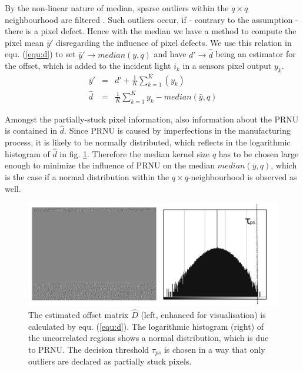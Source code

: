 \documentclass[10pt,twocolumn,letterpaper]{article}
\begin{document}
By the non-linear nature of median, sparse outliers within the $q \times q$ neighbourhood are filtered  \cite{fridrich}. Such outliers occur, if - contrary to the assumption - there is a pixel defect. Hence with the median we have a method to compute the pixel mean $\bar{y}'$ disregarding the influence of pixel defects. We use this relation in equ. (\ref{equ:d}) to set $\bar{y}' \rightarrow median(y,q)$ and have $d' \rightarrow \hat{d}$ being an estimator for the offset, which is added to the incident light $i_k$ in a sensors pixel output $y_k$.
\begin{eqnarray}
\bar{y}' & = & d'+\frac{1}{K}\sum\limits_{k=1}^{K}(y_k) \label{equ:modelWithD} \\
\hat{d} & = & \frac{1}{K}\sum\limits_{k=1}^{K}y_k - median(\bar{y},q) \label{equ:d}
\end{eqnarray}

Amongst the partially-stuck pixel information, also information about the PRNU is contained in $\hat{d}$. Since PRNU is caused by imperfections in the manufacturing process, it is likely to be normally distributed, which reflects in the logarithmic histogram of $\hat{d}$ in fig. \ref{fig:defectMat}. Therefore the median kernel size $q$ has to be chosen large enough to minimize the influence of PRNU on the median $median(\bar{y},q)$, which is the case if a normal distribution within the $q \times q$-neighbourhood is observed as well.

\begin{figure}
  \centering
  \includegraphics[width=\linewidth]{img/defectMatWithTau.png}
  \caption{The estimated offset matrix $\hat{D}$ (left, enhanced for visualisation) is calculated by equ. (\ref{equ:d}). The logarithmic histogram (right) of the uncorrelated regions shows a normal distribution, which is due to PRNU. The decision threshold $\tau_{ps}$ is chosen in a way that only outliers are declared as partially stuck pixels.}
  \label{fig:defectMat}
\end{figure}
\end{document}
